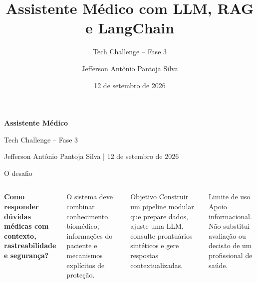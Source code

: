 \documentclass[aspectratio=169,11pt]{beamer}
\title[Assistente Médico]{Assistente Médico com LLM, RAG e LangChain}
\subtitle{Tech Challenge -- Fase 3}
\author{Jefferson Antônio Pantoja Silva}
\date{12 de setembro de 2026}
\begin{document}
\begin{frame}[plain]
  \vspace{1.25cm}
  {\color{white}\fontsize{28}{34}\selectfont\bfseries Assistente Médico\par}
  \vspace{0.35cm}
  {\color{mint}\Large Tech Challenge -- Fase 3\par}
  \vfill
  {\color{mint}\small Jefferson Antônio Pantoja Silva | 12 de setembro de 2026\par}
\end{frame}

\begin{frame}{O desafio}
  \begin{columns}[T,onlytextwidth]
    {\Large\bfseries Como responder dúvidas médicas com contexto, rastreabilidade e segurança?\par}
    \vspace{0.45cm}
    \normalsize
    O sistema deve combinar conhecimento biomédico, informações do paciente e mecanismos explícitos de proteção.
    \begin{block}{Objetivo}
      Construir um pipeline modular que prepare dados, ajuste uma LLM, consulte prontuários sintéticos e gere respostas contextualizadas.
    \end{block}
    \vspace{0.2cm}
    \begin{alertblock}{Limite de uso}
      Apoio informacional. Não substitui avaliação ou decisão de um profissional de saúde.
    \end{alertblock}
  \end{columns}
\end{frame}
\end{document}
